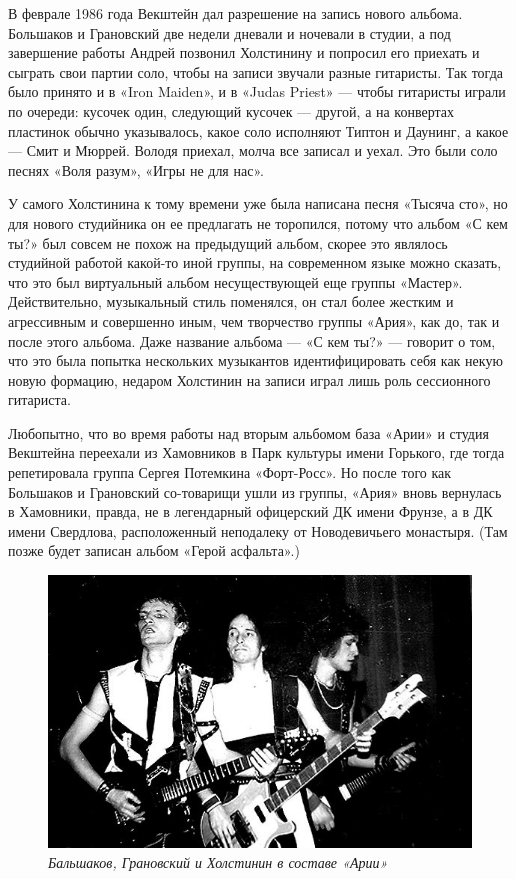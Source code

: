 \documentclass[16pt,a5paper,oneside]{book}
\begin{document}
В феврале 1986 года Векштейн дал разрешение на запись нового альбома. Большаков и Грановский две недели дневали и
ночевали в студии, а под завершение работы Андрей позвонил Холстинину и попросил его приехать и сыграть свои партии
соло, чтобы на записи звучали разные гитаристы. Так тогда было принято и в «Iron Maiden», и в «Judas Priest» — чтобы
гитаристы играли по очереди: кусочек один, следующий кусочек — другой, а на конвертах пластинок обычно указывалось,
какое соло исполняют Типтон и Даунинг, а какое — Смит и Мюррей. Володя приехал, молча все записал и уехал. Это были соло
песнях «Воля разум», «Игры не для нас».

У самого Холстинина к тому времени уже была написана песня «Тысяча сто», но для нового студийника он ее предлагать не
торопился, потому что альбом «С кем ты?» был совсем не похож на предыдущий альбом, скорее это являлось студийной работой
какой-то иной группы, на современном языке можно сказать, что это был виртуальный альбом несуществующей еще группы
«Мастер». Действительно, музыкальный стиль поменялся, он стал более жестким и агрессивным и совершенно иным, чем
творчество группы «Ария», как до, так и после этого альбома. Даже название альбома — «С кем ты?» — говорит о том, что
это была попытка нескольких музыкантов идентифицировать себя как некую новую формацию, недаром Холстинин на записи играл
лишь роль сессионного гитариста.

Любопытно, что во время работы над вторым альбомом база «Арии» и студия Векштейна переехали из Хамовников в Парк
культуры имени Горького, где тогда репетировала группа Сергея Потемкина «Форт-Росс». Но после того как Большаков и
Грановский со-товарищи ушли из группы, «Ария» вновь вернулась в Хамовники, правда, не в легендарный офицерский ДК имени
Фрунзе, а в ДК имени Свердлова, расположенный неподалеку от Новодевичьего монастыря. (Там позже будет записан альбом
«Герой асфальта».)

\begin{figure}
    \centering
    \includegraphics[scale=0.8]{Image15}
    \caption{\textit{Бальшаков, Грановский и Холстинин в составе «Арии»}}
\end{figure}
\end{document}
